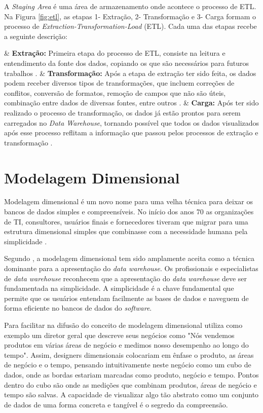 A \textit{Staging Area} é uma área de armazenamento onde acontece o processo de ETL. Na Figura \ref{fig:etl}, as etapas 1- Extração, 2- Transformação e 3- Carga formam o processo de \textit{Extraction-Transformation-Load} (ETL). Cada uma das etapas recebe a seguinte descrição:

\begin{easylist}[itemize]

	& \textbf{Extração: } Primeira etapa do processo de ETL, consiste na leitura e entendimento da fonte 		dos dados, copiando os que são necessários para futuros trabalhos \cite{Kimball2002}.  
	& \textbf{Transformação: } Após a etapa de extração ter sido feita, os dados podem receber diversos tipos de transformações, que incluem correções de conflitos, conversão de formatos, remoção de campos que não são úteis, combinação entre dados de diversas fontes, entre outros \cite{Kimball2002}.
	& \textbf{Carga: } Após ter sido realizado o processo de transformação, os dados já estão prontos para serem carregados no \textit{Data Warehouse}, tornando possível que todos os dados visualizados após esse processo reflitam a informação que passou pelos processos de extração e transformação \cite{neeraj_sharma_2011}.  

	\end{easylist}

\section{Modelagem Dimensional}

Modelagem dimensional é um novo nome para uma velha técnica para deixar os bancos de dados simples e compreensíveis. No início dos anos 70 as organizações de TI, consultores, usuários finais e fornecedores tiveram que migrar para uma estrutura dimensional simples que combinasse com a necessidade humana pela simplicidade \cite{Kimball2002}. 

Segundo , a modelagem dimensional tem sido amplamente aceita como a técnica dominante para a apresentação do \textit{data warehouse}. Os profissionais e especialistas de \textit{data warehouse} reconhecem que a apresentação do \textit{data warehouse} deve ser fundamentada na simplicidade. A simplicidade é a chave fundamental que permite que os usuários entendam facilmente as bases de dados e naveguem de forma eficiente no bancos de dados do \textit{software}. 

Para facilitar na difusão do conceito de modelagem dimensional  utiliza como exemplo um diretor geral que descreve seus negócios  como "Nós vendemos produtos em várias áreas de negócio e medimos nosso desempenho ao longo do tempo". Assim, designers dimensionais colocariam em ênfase o produto, as áreas de negócio e o tempo, pensando intuitivamente neste negócio como um cubo de dados, onde as bordas estariam marcadas como produto, negócio e tempo. Pontos dentro do cubo são onde as medições que combinam produtos, áreas de negócio e tempo são salvas. A capacidade de visualizar algo tão abstrato como um conjunto de dados de uma forma concreta e tangível é o segredo da compreensão.

